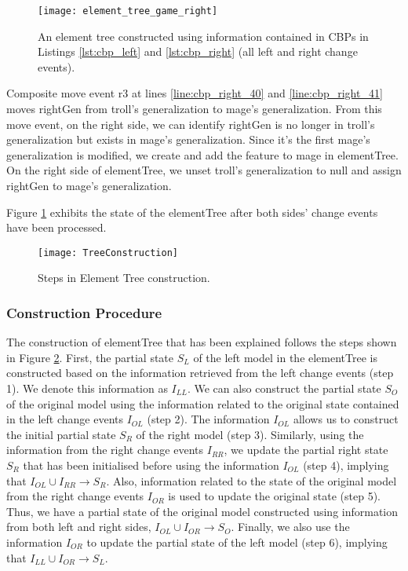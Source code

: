 \begin{figure}[ht]
  \centering
  \texttt{[image: element\_tree\_game\_right]}
  \caption{An element tree constructed using information contained in CBPs in Listings \ref{lst:cbp_left} and \ref{lst:cbp_right} (all left and right change events).}
  \label{fig:right_element_tree_diagram}
\end{figure} 

Composite move event \textsf{r3} at lines \ref{line:cbp_right_40} and \ref{line:cbp_right_41} moves \textsf{rightGen} from \textsf{troll}'s \textsf{generalization} to \textsf{mage}'s \textsf{generalization}. From this move event, on the right side, we can identify \textsf{rightGen} is no longer in \textsf{troll}'s \textsf{generalization} but exists in \textsf{mage}'s \textsf{generalization}. Since it's the first \textsf{mage}'s \textsf{generalization} is modified, we create and add the feature to \textsf{mage} in \textsf{elementTree}. On the right side of \textsf{elementTree}, we unset \textsf{troll}'s \textsf{generalization} to null and assign \textsf{rightGen} to \textsf{mage}'s \textsf{generalization}.

Figure \ref{fig:right_element_tree_diagram} exhibits the state of the \textsf{elementTree} after both sides' change events have been processed.

\begin{figure}
    \centering
    \texttt{[image: TreeConstruction]}
    \caption{Steps in Element Tree construction.}
    \label{fig:tree_construction}
\end{figure} 

\subsubsection{Construction Procedure}\label{sec:construction_procedure}
The construction of \textsf{elementTree} that has been explained follows the steps shown in Figure \ref{fig:tree_construction}. First, the partial
state $S_{L}$ of the left model in the \textsf{elementTree} is constructed based on the information retrieved from the left change events (step 1). We denote this information as $I_{LL}$. We can also construct the partial 
state $S_{O}$ of the original model using the information related to the original state contained in the left change events $I_{OL}$ (step 2). The information $I_{OL}$ allows us to construct the initial partial 
state $S_{R}$ of the right model 
(step 3). Similarly, using the information from the right change events $I_{RR}$, we update the partial right state $S_{R}$ that has been initialised before using the information $I_{OL}$ (step 4), implying that $I_{OL} \cup I_{RR} \rightarrow S_{R}$. Also, information related to the state of the original model from the right change events $I_{OR}$ is used to update the original state  (step 5). Thus, we have a partial state of the original model constructed using information from both left and right sides, $I_{OL} \cup I_{OR} \rightarrow S_{O}$. Finally, we also use the information $I_{OR}$ to update the partial state of the left model (step 6), implying that $I_{LL} \cup I_{OR} \rightarrow S_{L}$.  

